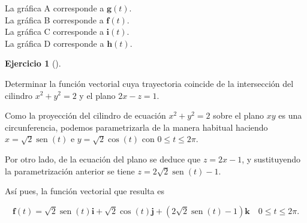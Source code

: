 \documentclass[
  a4paper,
]{scrreport}
\theoremstyle{definition}
\newtheorem{exercise}{Ejercicio}[chapter]
\theoremstyle{remark}
\begin{document}
\begin{tcolorbox}[enhanced jigsaw, coltitle=black, toptitle=1mm, colframe=quarto-callout-tip-color-frame, colbacktitle=quarto-callout-tip-color!10!white, breakable, opacityback=0, bottomtitle=1mm, opacitybacktitle=0.6, title=\textcolor{quarto-callout-tip-color}{\faLightbulb}\hspace{0.5em}{Solución}, arc=.35mm, leftrule=.75mm, toprule=.15mm, titlerule=0mm, bottomrule=.15mm, left=2mm, rightrule=.15mm, colback=white]

La gráfica A corresponde a \(\mathbf{g}(t)\).\\
La gráfica B corresponde a \(\mathbf{f}(t)\).\\
La gráfica C corresponde a \(\mathbf{i}(t)\).\\
La gráfica D corresponde a \(\mathbf{h}(t)\).

\end{tcolorbox}

\begin{exercise}[]\protect\hypertarget{exr-trayectoria-interseccion-superficies}{}\label{exr-trayectoria-interseccion-superficies}

Determinar la función vectorial cuya trayectoria coincide de la
intersección del cilindro \(x^2+y^2=2\) y el plano \(2x-z=1\).

\end{exercise}

\begin{tcolorbox}[enhanced jigsaw, coltitle=black, toptitle=1mm, colframe=quarto-callout-tip-color-frame, colbacktitle=quarto-callout-tip-color!10!white, breakable, opacityback=0, bottomtitle=1mm, opacitybacktitle=0.6, title=\textcolor{quarto-callout-tip-color}{\faLightbulb}\hspace{0.5em}{Solución}, arc=.35mm, leftrule=.75mm, toprule=.15mm, titlerule=0mm, bottomrule=.15mm, left=2mm, rightrule=.15mm, colback=white]

Como la proyección del cilindro de ecuación \(x^2+y^2=2\) sobre el plano
\(xy\) es una circunferencia, podemos parametrizarla de la manera
habitual haciendo \(x=\sqrt{2}\operatorname{sen}(t)\) e
\(y=\sqrt{2}\cos(t)\) con \(0\leq t \leq 2\pi\).

Por otro lado, de la ecuación del plano se deduce que \(z = 2x-1\), y
sustituyendo la parametrización anterior se tiene
\(z = 2\sqrt{2}\operatorname{sen}(t)-1\).

Así pues, la función vectorial que resulta es

\[
\mathbf{f}(t) = \sqrt{2}\operatorname{sen}(t)\mathbf{i} + \sqrt{2}\cos(t)\mathbf{j} + (2\sqrt{2}\operatorname{sen}(t)-1)\mathbf{k} \quad 0\leq t \leq 2\pi.
\]

\end{tcolorbox}
\end{document}
